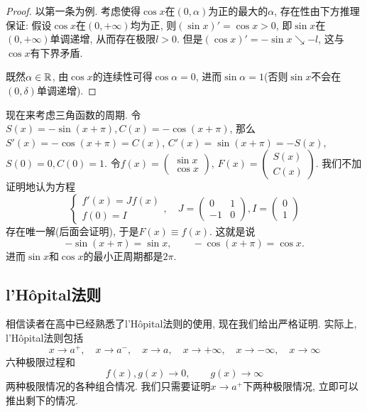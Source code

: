 \begin{proof}
	以第一条为例. 考虑使得$\cos x$在$(0,\alpha)$为正的最大的$\alpha$, 存在性由下方推理保证: 假设$\cos x$在$(0,+\infty)$均为正, 则$(\sin x)' = \cos x>0$, 即$\sin x$在$(0,+\infty)$单调递增, 从而存在极限$l>0$. 但是$(\cos x)' = -\sin x \searrow -l$, 这与$\cos x$有下界矛盾. 
	
	既然$\alpha \in \mathbb{R}$, 由$\cos x$的连续性可得$\cos \alpha=0$, 进而$\sin \alpha =1$(否则$\sin x$不会在$(0,\delta)$单调递增). 
\end{proof}

现在来考虑三角函数的周期. 令$S(x)=-\sin (x+\pi), C(x)=-\cos (x+\pi)$, 那么$S'(x) = -\cos (x+\pi) = C(x)$, $C'(x) = \sin (x+\pi) = -S(x)$, $S(0)=0, C(0)=1$. 令$f(x)=\begin{pmatrix}
	\sin x \\ \cos x
\end{pmatrix}$, $F(x) = \begin{pmatrix}
	S(x) \\ C(x)
\end{pmatrix}$. 我们不加证明地认为方程$$\begin{cases}
	f'(x)=Jf(x) \\ f(0)=I
\end{cases},\quad J=\begin{pmatrix}
		0 & 1 \\ -1 & 0
	\end{pmatrix}, I=\begin{pmatrix}
		0 \\ 1
	\end{pmatrix}$$存在唯一解(后面会证明), 于是$F(x) \equiv f(x)$. 这就是说$$-\sin (x+\pi) = \sin x,\qquad -\cos (x+\pi) = \cos x. $$
进而$\sin x$和$\cos x$的最小正周期都是$2\pi$. 

\subsection{l’Hôpital法则}

相信读者在高中已经熟悉了l’Hôpital法则的使用, 现在我们给出严格证明. 实际上, l’Hôpital法则包括$$x \to a^+, \quad x\to a^-, \quad x \to a, \quad x \to +\infty , \quad x \to - \infty , \quad x \to \infty$$
六种极限过程和$$f(x),g(x) \to 0,\qquad g(x) \to \infty$$
两种极限情况的各种组合情况. 我们只需要证明$x \to a^+$下两种极限情况, 立即可以推出剩下的情况. 

